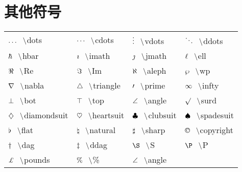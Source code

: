 \documentclass{ctexart}
\newcommand{\pair}[2]{${#1} \hspace{0.3cm} \backslash ${#2}}
\begin{document}
\section{其他符号}
\begin{tabular}{p{3cm}p{3cm}p{3cm}p{3cm}}
    \pair{\dots}{dots}               & \pair{\cdots}{cdots}         & \pair{\vdots}{vdots}       & \pair{\ddots}{ddots}         \\
    \pair{\hbar}{hbar}               & \pair{\imath}{imath}         & \pair{\jmath}{jmath}       & \pair{\ell}{ell}             \\
    \pair{\Re}{Re}                   & \pair{\Im}{Im}               & \pair{\aleph}{aleph}       & \pair{\wp}{wp}               \\
    \pair{\nabla}{nabla}             & \pair{\triangle}{triangle}   & \pair{\prime}{prime}       & \pair{\infty}{infty}         \\
    \pair{\bot}{bot}                 & \pair{\top}{top}             & \pair{\angle}{angle}       & \pair{\surd}{surd}           \\
    \pair{\diamondsuit}{diamondsuit} & \pair{\heartsuit}{heartsuit} & \pair{\clubsuit}{clubsuit} & \pair{\spadesuit}{spadesuit} \\
    \pair{\flat}{flat}               & \pair{\natural}{natural}     & \pair{\sharp}{sharp}       & \pair{\copyright}{copyright} \\
    \pair{\dag}{dag}                 & \pair{\ddag}{ddag}           & \pair{\S}{S}               & \pair{\P}{P}                 \\
    \pair{\pounds}{pounds}           & \pair{\%}{\%}                & \pair{\angle}{angle}       &                              \\
\end{tabular}
\end{document}
